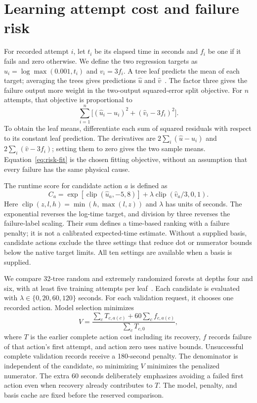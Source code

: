 \section{Learning attempt cost and failure risk}
\label{app:risk}
For recorded attempt $i$, let $t_i$ be its elapsed time in seconds and $f_i$ be one if it fails and zero otherwise. We define the two regression targets as $u_i=\log\max(0.001,t_i)$ and $v_i=3f_i$. A tree leaf predicts the mean of each target; averaging the trees gives predictions $\widehat u$ and $\widehat v$~\cite{Breiman2001Forest}. The factor three gives the failure output more weight in the two-output squared-error split objective. For $n$ attempts, that objective is proportional to
\begin{equation}
 \sum_{i=1}^n\bigl[(\widehat u_i-u_i)^2+(\widehat v_i-3f_i)^2\bigr].
 \label{eq:risk-fit}
\end{equation}
To obtain the leaf means, differentiate each sum of squared residuals with respect to its constant leaf prediction. The derivatives are $2\sum_i(\widehat u-u_i)$ and $2\sum_i(\widehat v-3f_i)$; setting them to zero gives the two sample means. Equation~\eqref{eq:risk-fit} is the chosen fitting objective, without an assumption that every failure has the same physical cause.

The runtime score for candidate action $a$ is defined as
\begin{equation}
 C_a=\exp[\operatorname{clip}(\widehat u_a,-5,8)]
       +\lambda\operatorname{clip}(\widehat v_a/3,0,1).
 \label{eq:risk-score}
\end{equation}
Here $\operatorname{clip}(z,l,h)=\min(h,\max(l,z))$ and $\lambda$ has units of seconds. The exponential reverses the log-time target, and division by three reverses the failure-label scaling. Their sum defines a time-based ranking with a failure penalty; it is not a calibrated expected-time estimate. Without a supplied basis, candidate actions exclude the three settings that reduce dot or numerator bounds below the native target limits. All ten settings are available when a basis is supplied.

We compare 32-tree random and extremely randomized forests at depths four and six, with at least five training attempts per leaf~\cite{Breiman2001Forest,Geurts2006ExtraTrees}. Each candidate is evaluated with $\lambda\in\{0,20,60,120\}$ seconds. For each validation request, it chooses one recorded action. Model selection minimizes
\begin{equation}
 V=\frac{\sum_c T_{c,a(c)}+60\sum_c f_{c,a(c)}}{\sum_c T_{c,0}},
 \label{eq:risk-selection}
\end{equation}
where $T$ is the earlier complete action cost including its recovery, $f$ records failure of that action's first attempt, and action zero uses native bounds. Unsuccessful complete validation records receive a 180-second penalty. The denominator is independent of the candidate, so minimizing $V$ minimizes the penalized numerator. The extra 60 seconds deliberately emphasizes avoiding a failed first action even when recovery already contributes to $T$. The model, penalty, and basis cache are fixed before the reserved comparison.

